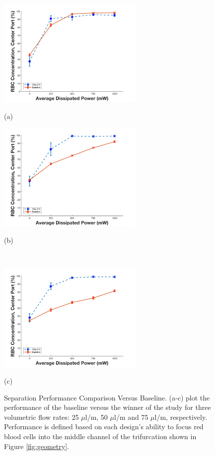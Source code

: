 \begin{figure}[H]
  \begin{minipage}[t]{0.49\linewidth}\centering
    \includegraphics[width=7cm]{ErrorBarBloodData25ul}
    \medskip
    \centerline{(a)}
  \end{minipage}\hfill
  \begin{minipage}[t]{0.49\linewidth}\centering
    \includegraphics[width=7cm]{ErrorBarBloodData50ul}
    \medskip
    \centerline{(b)}\\
  \end{minipage}
  \begin{minipage}[t]{0.99\linewidth}\centering
    \includegraphics[width=7cm]{ErrorBarBloodData75ul}
    \medskip
    \centerline{(c)}
  \end{minipage}
  \caption[Separation Performance Comparison Versus Baseline]{Separation Performance Comparison Versus Baseline. (a-c) plot the performance of the baseline versus the winner of the study for three volumetric flow rates: 25 $\mu$l/m, 50 $\mu$l/m and 75 $\mu$l/m, respectively. Performance is defined based on each design's ability to focus red blood cells into the middle channel of the trifurcation shown in Figure \ref{fig:geometry}.}
	\label{fig:headToHeadBlood}
\end{figure}

